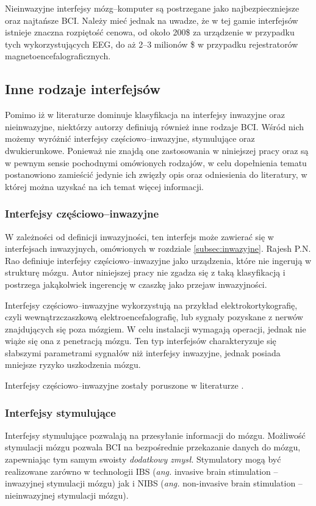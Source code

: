 \documentclass[skorowidz,skroty]{dyplomWEZUT}
\begin{document}
Nieinwazyjne interfejsy mózg--komputer są postrzegane jako najbezpieczniejsze oraz najtańsze BCI\cite{bci_trends}. Należy mieć jednak na uwadze, że w tej gamie interfejsów istnieje znaczna rozpiętość cenowa, od około 200\$ za urządzenie w przypadku tych wykorzystujących EEG, do aż 2--3 milionów \$ w przypadku rejestratorów magnetoencefalograficznych\cite{bci_neuroimaging}.


\subsection{Inne rodzaje interfejsów}
Pomimo iż w literaturze dominuje klasyfikacja na interfejsy inwazyjne oraz nieinwazyjne, niektórzy autorzy definiują również inne rodzaje BCI. Wśród nich możemy wyróżnić interfejsy częściowo--inwazyjne, stymulujące oraz dwukierunkowe. Ponieważ nie znajdą one zastosowania w niniejszej pracy oraz są w pewnym sensie pochodnymi omówionych rodzajów, w celu dopełnienia tematu postanowiono zamieścić jedynie ich zwięzły opis oraz odniesienia do literatury, w której można uzyskać na ich temat więcej informacji.

\subsubsection{Interfejsy częściowo--inwazyjne}
W zależności od definicji inwazyjności, ten interfejs może zawierać się w interfejsach inwazyjnych, omówionych w rozdziale \vref{subsec:inwazyjne}. Rajesh P.N. Rao definiuje interfejsy częściowo--inwazyjne jako urządzenia, które nie ingerują w strukturę mózgu\cite{bci_introduction}. Autor niniejszej pracy nie zgadza się z taką klasyfikacją i postrzega jakąkolwiek ingerencję w czaszkę jako przejaw inwazyjności.

Interfejsy częściowo--inwazyjne wykorzystują na przykład elektrokortykografię, czyli wewnątrzczaszkową elektroencefalografię, lub sygnały pozyskane z nerwów znajdujących się poza mózgiem. W celu instalacji wymagają operacji, jednak nie wiąże się ona z penetracją mózgu. Ten typ interfejsów charakteryzuje się słabszymi parametrami sygnałów niż interfejsy inwazyjne, jednak posiada mniejsze ryzyko uszkodzenia mózgu\cite{bci_trends}.

Interfejsy częściowo--inwazyjne zostały poruszone w literaturze \cite{bci_introduction,bci_trends,bci_revolutionizing}.

\subsubsection{Interfejsy stymulujące}
Interfejsy stymulujące pozwalają na przesyłanie informacji do mózgu. Możliwość stymulacji mózgu pozwala BCI na bezpośrednie przekazanie danych do mózgu\cite{bci_introduction}, zapewniając tym samym swoisty \textit{dodatkowy zmysł}. Stymulatory mogą być realizowane zarówno w technologii IBS (\textit{ang.} invasive brain stimulation -- inwazyjnej stymulacji mózgu) jak i NIBS (\textit{ang.} non-invasive brain stimulation -- nieinwazyjnej stymulacji mózgu).
\end{document}

